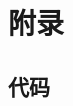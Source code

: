 \documentclass[UTF8]{ctexart}
\begin{document}
\newpage %




% 

\section{附录}
\subsection{代码}

\lstset{language=python}
\begin{lstlisting}
	
\end{lstlisting}
\end{document}
